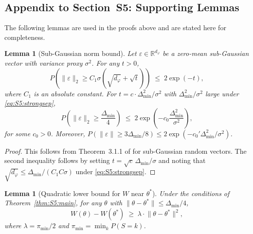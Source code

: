 \documentclass[twoside]{article}
\theoremstyle{plain}
\newtheorem{lemma}[theorem]{Lemma}
\theoremstyle{definition}
\theoremstyle{remark}
\newcommand{\R}{\mathbb{R}}
\newcommand{\1}{\mathbf{1}}
\renewcommand{\phi}{\varphi}
\newcommand{\norm}[1]{\lVert#1\rVert}
\begin{document}
\subsection*{Appendix to Section~S5: Supporting Lemmas}
\label{sec:S5:app}

The following lemmas are used in the proofs above and are stated here
for completeness.

\begin{lemma}[Sub-Gaussian norm bound]
\label{lem:S5:sgnorm}
Let $\varepsilon\in\R^{d_\phi}$ be a zero-mean sub-Gaussian vector with
variance proxy $\sigma^2$.  For any $t>0$,
\[
P\!\left(\norm{\varepsilon}_2\ge C_1\sigma(\sqrt{d_\phi}+\sqrt{t})\right)
\;\le\; 2\exp(-t),
\]
where $C_1$ is an absolute constant.  For
$t=c\cdot\Delta_{\min}^2/\sigma^2$ with $\Delta_{\min}^2/\sigma^2$
large under \eqref{eq:S5:strongsep},
\[
P\!\left(\norm{\varepsilon}_2\ge\frac{\Delta_{\min}}{4}\right)
\;\le\; 2\exp\!\left(-c_0\frac{\Delta_{\min}^2}{\sigma^2}\right),
\]
for some $c_0>0$.  Moreover,
$P(\norm{\varepsilon}\ge3\Delta_{\min}/8)
\le 2\exp(-c_0'\Delta_{\min}^2/\sigma^2)$.
\end{lemma}

\begin{proof}
This follows from Theorem~3.1.1 of \cite{vershynin2018highdimensional}
for sub-Gaussian random vectors.  The second inequality follows by
setting $t=\sqrt{c}\,\Delta_{\min}/\sigma$ and noting that
$\sqrt{d_\phi}\le\Delta_{\min}/(C_1 C\sigma)$ under
\eqref{eq:S5:strongsep}.
\end{proof}

\begin{lemma}[Quadratic lower bound for $W$ near $\theta^*$]
\label{lem:S5:quad}
Under the conditions of Theorem~\ref{thm:S5:main}, for any $\theta$ with
$\norm{\theta-\theta^*}\le\Delta_{\min}/4$,
\[
W(\theta)-W(\theta^*)\;\ge\;\lambda\cdot\norm{\theta-\theta^*}^2,
\]
where $\lambda=\pi_{\min}/2$ and $\pi_{\min}=\min_k P(S=k)$.
\end{lemma}
\end{document}
